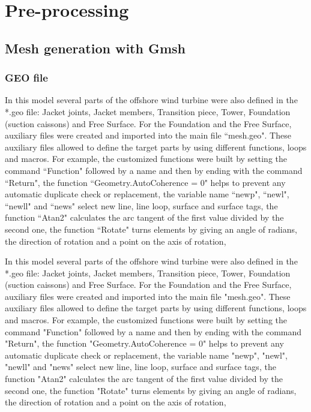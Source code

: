 \documentclass[a4]{article}
\begin{document}
\section{Pre-processing}

\subsection{Mesh generation with Gmsh}

\subsubsection{GEO file}

In this model several parts of the offshore wind turbine were also defined in the *.geo file: Jacket joints, Jacket members, Transition piece, Tower, Foundation (suction caissons) and Free Surface. For the Foundation and the Free Surface, auxiliary files were created and imported into the main file ``mesh.geo". These auxiliary files allowed to define the target parts by using different functions, loops and macros. For example, the customized functions were built by setting the command ``Function" followed by a name and then by ending with the command ``Return", the function ``Geometry.AutoCoherence = 0" helps to prevent any automatic duplicate check or replacement, the variable name ``newp", ``newl", ``newll" and ``news" select new line, line loop, surface and surface tags, the function ``Atan2" calculates the arc tangent of the first value divided by the second one, the function ``Rotate" turns elements by giving an angle of radians, the direction of rotation and a point on the axis of rotation, 

In this model several parts of the offshore wind turbine were also defined in the *.geo file: Jacket joints, Jacket members, Transition piece, Tower, Foundation (suction caissons) and Free Surface. For the Foundation and the Free Surface, auxiliary files were created and imported into the main file "mesh.geo". These auxiliary files allowed to define the target parts by using different functions, loops and macros. For example, the customized functions were built by setting the command "Function" followed by a name and then by ending with the command "Return", the function "Geometry.AutoCoherence = 0" helps to prevent any automatic duplicate check or replacement, the variable name "newp", "newl", "newll" and "news" select new line, line loop, surface and surface tags, the function "Atan2" calculates the arc tangent of the first value divided by the second one, the function "Rotate" turns elements by giving an angle of radians, the direction of rotation and a point on the axis of rotation, 
\end{document}
